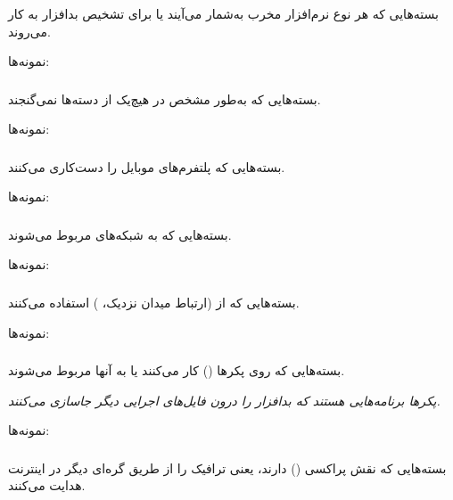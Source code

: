 \documentclass[a4paper, oneside, 11pt]{book}
\begin{document}
\subsubsection{}
بسته‌هایی که هر نوع نرم‌افزار مخرب به‌شمار می‌آیند یا برای تشخیص بدافزار به کار
می‌روند.

نمونه‌ها: 

\subsubsection{}
بسته‌هایی که به‌طور مشخص در هیچ‌یک از دسته‌ها نمی‌گنجند.

نمونه‌ها: 

\subsubsection{}
بسته‌هایی که پلتفرم‌های موبایل را دست‌کاری می‌کنند.

نمونه‌ها: 

\subsubsection{}
بسته‌هایی که به شبکه‌های  مربوط می‌شوند.

نمونه‌ها: 

\subsubsection{}
بسته‌هایی که از  (ارتباط میدان نزدیک، ) استفاده
می‌کنند.

نمونه‌ها: 

\subsubsection{}
بسته‌هایی که روی پکرها () کار می‌کنند یا به آنها مربوط می‌شوند.

\textit{پکرها برنامه‌هایی هستند که بدافزار را درون فایل‌های اجرایی دیگر جاسازی
می‌کنند.}

نمونه‌ها: 

\subsubsection{}
بسته‌هایی که نقش پراکسی () دارند، یعنی ترافیک را از طریق گره‌ای دیگر در
اینترنت هدایت می‌کنند.
\end{document}

